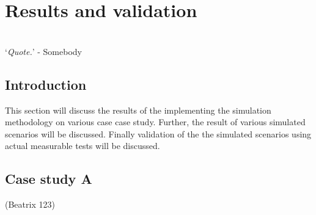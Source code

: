 \chapter{Results and validation}
\thispagestyle{empty}
\vspace{38em}
\hrulefill
\\
\enquote*{\textit{Quote.}} - Somebody\\
\newpage
\section{Introduction}
This section will discuss the results of the implementing the simulation methodology on various case case study. Further, the result of various simulated scenarios will be discussed. Finally validation of the the simulated scenarios using actual measurable tests will be discussed.
\section{Case study A}
{\color{blue}(Beatrix 123)}
